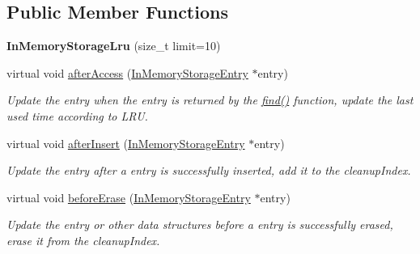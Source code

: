 \subsection*{Public Member Functions}
\begin{DoxyCompactItemize}
\item 
{\bfseries In\+Memory\+Storage\+Lru} (size\+\_\+t limit=10)\hypertarget{classndn_1_1util_1_1InMemoryStorageLru_a73a78257ef3d70e8bcb6a1f7d12d9457}{}\label{classndn_1_1util_1_1InMemoryStorageLru_a73a78257ef3d70e8bcb6a1f7d12d9457}

\item 
virtual void \hyperlink{classndn_1_1util_1_1InMemoryStorageLru_ac30869da82fb246daebf534ca7ce8157}{after\+Access} (\hyperlink{classndn_1_1util_1_1InMemoryStorageEntry}{In\+Memory\+Storage\+Entry} $\ast$entry)\hypertarget{classndn_1_1util_1_1InMemoryStorageLru_ac30869da82fb246daebf534ca7ce8157}{}\label{classndn_1_1util_1_1InMemoryStorageLru_ac30869da82fb246daebf534ca7ce8157}

\begin{DoxyCompactList}\small\item\em Update the entry when the entry is returned by the \hyperlink{classndn_1_1util_1_1InMemoryStorage_a01ee745af540a1d99b5a18c5722d50c5}{find()} function, update the last used time according to L\+RU. \end{DoxyCompactList}\item 
virtual void \hyperlink{classndn_1_1util_1_1InMemoryStorageLru_a2b8a8d34f1d4c3e04d0111e6b78f280b}{after\+Insert} (\hyperlink{classndn_1_1util_1_1InMemoryStorageEntry}{In\+Memory\+Storage\+Entry} $\ast$entry)\hypertarget{classndn_1_1util_1_1InMemoryStorageLru_a2b8a8d34f1d4c3e04d0111e6b78f280b}{}\label{classndn_1_1util_1_1InMemoryStorageLru_a2b8a8d34f1d4c3e04d0111e6b78f280b}

\begin{DoxyCompactList}\small\item\em Update the entry after a entry is successfully inserted, add it to the cleanup\+Index. \end{DoxyCompactList}\item 
virtual void \hyperlink{classndn_1_1util_1_1InMemoryStorageLru_a52d479a2f5349df751afd701e4e2aaed}{before\+Erase} (\hyperlink{classndn_1_1util_1_1InMemoryStorageEntry}{In\+Memory\+Storage\+Entry} $\ast$entry)\hypertarget{classndn_1_1util_1_1InMemoryStorageLru_a52d479a2f5349df751afd701e4e2aaed}{}\label{classndn_1_1util_1_1InMemoryStorageLru_a52d479a2f5349df751afd701e4e2aaed}

\begin{DoxyCompactList}\small\item\em Update the entry or other data structures before a entry is successfully erased, erase it from the cleanup\+Index. \end{DoxyCompactList}\end{DoxyCompactItemize}
